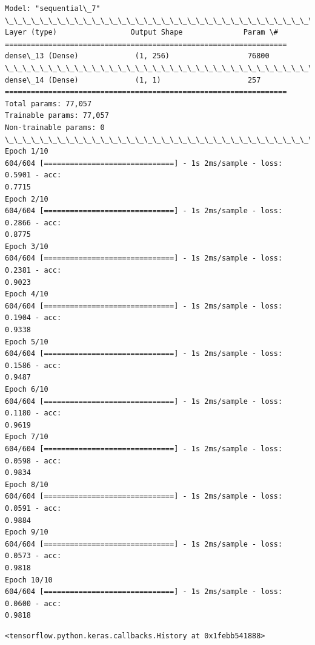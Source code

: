 \documentclass[11pt]{article}
\makeatletter
\newcommand{\boxspacing}{\kern\kvtcb@left@rule\kern\kvtcb@boxsep}
\newcommand{\prompt}[4]{
        \ttfamily\llap{{\color{#2}[#3]:\hspace{3pt}#4}}\vspace{-\baselineskip}
    }
\makeatother
\begin{document}
    \begin{Verbatim}[commandchars=\\\{\}]
Model: "sequential\_7"
\_\_\_\_\_\_\_\_\_\_\_\_\_\_\_\_\_\_\_\_\_\_\_\_\_\_\_\_\_\_\_\_\_\_\_\_\_\_\_\_\_\_\_\_\_\_\_\_\_\_\_\_\_\_\_\_\_\_\_\_\_\_\_\_\_
Layer (type)                 Output Shape              Param \#
=================================================================
dense\_13 (Dense)             (1, 256)                  76800
\_\_\_\_\_\_\_\_\_\_\_\_\_\_\_\_\_\_\_\_\_\_\_\_\_\_\_\_\_\_\_\_\_\_\_\_\_\_\_\_\_\_\_\_\_\_\_\_\_\_\_\_\_\_\_\_\_\_\_\_\_\_\_\_\_
dense\_14 (Dense)             (1, 1)                    257
=================================================================
Total params: 77,057
Trainable params: 77,057
Non-trainable params: 0
\_\_\_\_\_\_\_\_\_\_\_\_\_\_\_\_\_\_\_\_\_\_\_\_\_\_\_\_\_\_\_\_\_\_\_\_\_\_\_\_\_\_\_\_\_\_\_\_\_\_\_\_\_\_\_\_\_\_\_\_\_\_\_\_\_
Epoch 1/10
604/604 [==============================] - 1s 2ms/sample - loss: 0.5901 - acc:
0.7715
Epoch 2/10
604/604 [==============================] - 1s 2ms/sample - loss: 0.2866 - acc:
0.8775
Epoch 3/10
604/604 [==============================] - 1s 2ms/sample - loss: 0.2381 - acc:
0.9023
Epoch 4/10
604/604 [==============================] - 1s 2ms/sample - loss: 0.1904 - acc:
0.9338
Epoch 5/10
604/604 [==============================] - 1s 2ms/sample - loss: 0.1586 - acc:
0.9487
Epoch 6/10
604/604 [==============================] - 1s 2ms/sample - loss: 0.1180 - acc:
0.9619
Epoch 7/10
604/604 [==============================] - 1s 2ms/sample - loss: 0.0598 - acc:
0.9834
Epoch 8/10
604/604 [==============================] - 1s 2ms/sample - loss: 0.0591 - acc:
0.9884
Epoch 9/10
604/604 [==============================] - 1s 2ms/sample - loss: 0.0573 - acc:
0.9818
Epoch 10/10
604/604 [==============================] - 1s 2ms/sample - loss: 0.0600 - acc:
0.9818
    \end{Verbatim}

            \begin{tcolorbox}[breakable, size=fbox, boxrule=.5pt, pad at break*=1mm, opacityfill=0]
\prompt{Out}{outcolor}{141}{\boxspacing}
\begin{Verbatim}[commandchars=\\\{\}]
<tensorflow.python.keras.callbacks.History at 0x1febb541888>
\end{Verbatim}
\end{tcolorbox}
        
\end{document}
